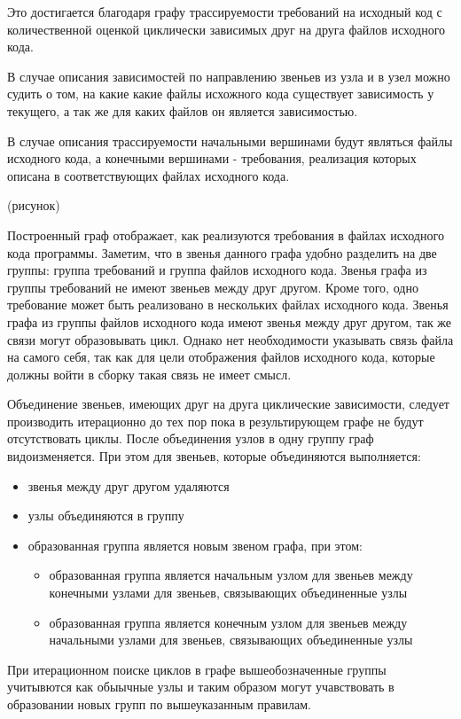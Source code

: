 Это достигается благодаря графу трассируемости требований на исходный код с количественной оценкой циклически зависимых друг на друга файлов исходного кода.

В случае описания зависимостей по направлению звеньев из узла и в узел можно судить о том, на какие какие файлы исхожного кода существует зависимость у текущего, а так же для каких файлов он является зависимостью.

В случае описания трассируемости начальными вершинами будут являться файлы исходного кода, а конечными вершинами - требования, реализация которых описана в соответствующих файлах исходного кода.

(рисунок)

Построенный граф отображает, как реализуются требования в файлах исходного кода программы. Заметим, что в звенья данного графа удобно разделить на две группы: группа требований и группа файлов исходного кода. Звенья графа из группы требований не имеют звеньев между друг другом. Кроме того, одно требование может быть реализовано в нескольких файлах исходного кода. Звенья графа из группы файлов исходного кода имеют звенья между друг другом, так же связи могут образовывать цикл. Однако нет необходимости указывать связь файла на самого себя, так как для цели отображения файлов исходного кода, которые должны войти в сборку такая связь не имеет смысл.

Объединение звеньев, имеющих друг на друга циклические зависимости, следует производить итерационно до тех пор пока в результирующем графе не будут отсутствовать циклы. После объединения узлов в одну группу граф видоизменяется. При этом для звеньев, которые объединяются выполняется:
\begin{itemize}
	\item звенья между друг другом удаляются
	\item узлы объединяются в группу
	\item образованная группа является новым звеном графа, при этом:
	\begin{itemize}
		\item образованная группа является начальным узлом для звеньев между конечными узлами для звеньев, связывающих объединенные узлы
		\item образованная группа является конечным узлом для звеньев между начальными узлами для звеньев, связывающих объединенные узлы
	\end{itemize}
\end{itemize}

При итерационном поиске циклов в графе вышеобозначенные группы учитывются как обыычные узлы и таким образом могут учавствовать в образовании новых групп по вышеуказанным правилам.